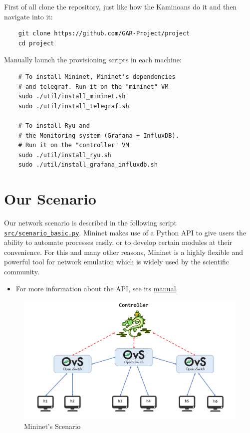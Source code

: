 \documentclass[12pt]{article}
\begin{document}
		First of all clone the repository, just like how the Kaminoans do it and then navigate into it:

		\begin{verbatim}
	git clone https://github.com/GAR-Project/project
	cd project
		\end{verbatim}

		Manually launch the provisioning scripts in each machine:

		\begin{verbatim}
	# To install Mininet, Mininet's dependencies
	# and telegraf. Run it on the "mininet" VM
	sudo ./util/install_mininet.sh
	sudo ./util/install_telegraf.sh

	# To install Ryu and
	# the Monitoring system (Grafana + InfluxDB).
	# Run it on the "controller" VM
	sudo ./util/install_ryu.sh
	sudo ./util/install_grafana_influxdb.sh
		\end{verbatim}

\section{Our Scenario}
	Our network scenario is described in the following script \href{https://github.com/GAR-Project/project/blob/master/src/scenario_basic.py}{\texttt{src/scenario\_basic.py}}. Mininet makes use of a Python API to give users the ability to automate processes easily, or to develop certain modules at their convenience. For this and many other reasons, Mininet is a highly flexible and powerful tool for network emulation which is widely used by the scientific community.

	\begin{itemize}
		\item For more information about the API, see its \href{http://mininet.org/api/annotated.html}{manual}.
	\end{itemize}

	\begin{figure}
		\centering
		\includegraphics[width=\linewidth]{scenario.png}
		\caption{Mininet's Scenario}
		\label{f:scenario}
	\end{figure}
\end{document}
